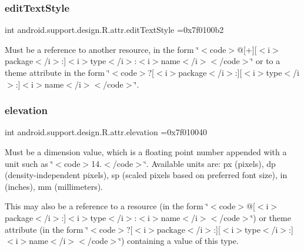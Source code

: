 \subsubsection{\texorpdfstring{edit\+Text\+Style}{editTextStyle}}
{\footnotesize\ttfamily int android.\+support.\+design.\+R.\+attr.\+edit\+Text\+Style =0x7f0100b2\hspace{0.3cm}{\ttfamily [static]}}

Must be a reference to another resource, in the form \char`\"{}$<$code$>$@\mbox{[}+\mbox{]}\mbox{[}$<$i$>$package$<$/i$>$\+:\mbox{]}$<$i$>$type$<$/i$>$\+:$<$i$>$name$<$/i$>$$<$/code$>$\char`\"{} or to a theme attribute in the form \char`\"{}$<$code$>$?\mbox{[}$<$i$>$package$<$/i$>$\+:\mbox{]}\mbox{[}$<$i$>$type$<$/i$>$\+:\mbox{]}$<$i$>$name$<$/i$>$$<$/code$>$\char`\"{}. \mbox{\label{classandroid_1_1support_1_1design_1_1R_1_1attr_a5089b576eabe15b5d530b536c68a760d}} 
\subsubsection{\texorpdfstring{elevation}{elevation}}
{\footnotesize\ttfamily int android.\+support.\+design.\+R.\+attr.\+elevation =0x7f010040\hspace{0.3cm}{\ttfamily [static]}}

Must be a dimension value, which is a floating point number appended with a unit such as \char`\"{}$<$code$>$14.\+5sp$<$/code$>$\char`\"{}. Available units are\+: px (pixels), dp (density-\/independent pixels), sp (scaled pixels based on preferred font size), in (inches), mm (millimeters). 

This may also be a reference to a resource (in the form \char`\"{}$<$code$>$@\mbox{[}$<$i$>$package$<$/i$>$\+:\mbox{]}$<$i$>$type$<$/i$>$\+:$<$i$>$name$<$/i$>$$<$/code$>$\char`\"{}) or theme attribute (in the form \char`\"{}$<$code$>$?\mbox{[}$<$i$>$package$<$/i$>$\+:\mbox{]}\mbox{[}$<$i$>$type$<$/i$>$\+:\mbox{]}$<$i$>$name$<$/i$>$$<$/code$>$\char`\"{}) containing a value of this type. \mbox{\label{classandroid_1_1support_1_1design_1_1R_1_1attr_a5430c3e8b84d5e2125c6abe6790c3ce6}} 
